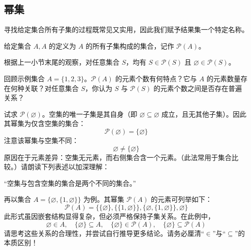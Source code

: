 \subsection{幂集}

寻找给定集合所有子集的过程既常见又实用，因此我们赋予结果集一个特定名称。

\begin{definition}
    给定集合 $A, A$ 的定义为 $A$ 的所有子集构成的集合，记作 $\mathcal{P}(A)$。
\end{definition}

根据上一小节末尾的观察，对任意集合 $S$，均有 $S \in \mathcal{P}(S)$ 且 $\varnothing \in \mathcal{P}(S)$。

回顾示例集合 $A = \{1, 2, 3\}$。$\mathcal{P}(A)$ 的元素个数有何特点？它与 $A$ 的元素数量存在何种关联？对任意集合 $S$，你认为 $S$ 与 $\mathcal{P}(S)$ 的元素个数之间是否存在普遍关系？

\begin{example}
    试求 $\mathcal{P}(\varnothing)$。空集的唯一子集是其自身（即 $\varnothing \subseteq \varnothing$ 成立，且无其他子集）。因此其幂集为仅含空集的集合：
    \[\mathcal{P}(\varnothing) = \{ \varnothing \}\]
    注意该幂集与空集不同：
    \[\varnothing \ne \{ \varnothing \}\]
    原因在于元素差异：空集无元素，而右侧集合含一个元素。（此法常用于集合比较。）请朗读下列表述以加深理解：
    \begin{center}
        ``空集与包含空集的集合是两个不同的集合。''
    \end{center}
\end{example}

\begin{example}
    再以集合 $A = \{\varnothing, \{1, \varnothing\}\}$ 为例。其幂集 $\mathcal{P}(A)$ 的元素可列举如下：
    \[\mathcal{P}(A) = \Big\{\{\varnothing\}, \big\{\{1, \varnothing\}\big\}, \big\{\varnothing, \{1, \varnothing\}\big\}, \varnothing \Big\}\]
    此形式虽因嵌套结构显得复杂，但必须严格保持子集关系。在此例中，
    \[\varnothing \in A, \quad \{\varnothing\} \subseteq A, \quad \{\varnothing\} \in \mathcal{P}(A), \quad \{\varnothing\} \subseteq \mathcal{P}(A)\]
    请思考这些关系的合理性，并尝试自行推导更多结论。请务必厘清``$\in$''与``$\subseteq$''的本质区别！
\end{example}
